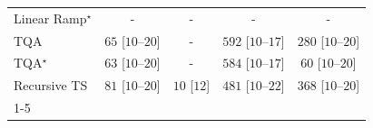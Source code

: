 \begin{tabular}{l|cccc|}
Linear Ramp$^\star$ & {\cellcolor[HTML]{000000}} \color[HTML]{F1F1F1} {\cellcolor{white}} \color{black} - & {\cellcolor[HTML]{000000}} \color[HTML]{F1F1F1} {\cellcolor{white}} \color{black} - & {\cellcolor[HTML]{000000}} \color[HTML]{F1F1F1} {\cellcolor{white}} \color{black} - & {\cellcolor[HTML]{000000}} \color[HTML]{F1F1F1} {\cellcolor{white}} \color{black} - \\
TQA & {\cellcolor[HTML]{ECF8E8}} \color[HTML]{000000} $65$ [$10$--$20$] & {\cellcolor[HTML]{000000}} \color[HTML]{F1F1F1} {\cellcolor{white}} \color{black} - & {\cellcolor[HTML]{268E47}} \color[HTML]{F1F1F1} $592$ [$10$--$17$] & {\cellcolor[HTML]{AADDA4}} \color[HTML]{000000} $280$ [$10$--$20$] \\
TQA$^\star$ & {\cellcolor[HTML]{ECF8E8}} \color[HTML]{000000} $63$ [$10$--$20$] & {\cellcolor[HTML]{000000}} \color[HTML]{F1F1F1} {\cellcolor{white}} \color{black} - & {\cellcolor[HTML]{29914A}} \color[HTML]{F1F1F1} $584$ [$10$--$17$] & {\cellcolor[HTML]{EDF8E9}} \color[HTML]{000000} $60$ [$10$--$20$] \\
Recursive TS & {\cellcolor[HTML]{E9F7E5}} \color[HTML]{000000} $81$ [$10$--$20$] & {\cellcolor[HTML]{F6FCF4}} \color[HTML]{000000} $10$ [$12$] & {\cellcolor[HTML]{4DB163}} \color[HTML]{F1F1F1} $481$ [$10$--$22$] & {\cellcolor[HTML]{84CC83}} \color[HTML]{000000} $368$ [$10$--$20$] \\
\cline{1-5}
\bottomrule
\end{tabular}
